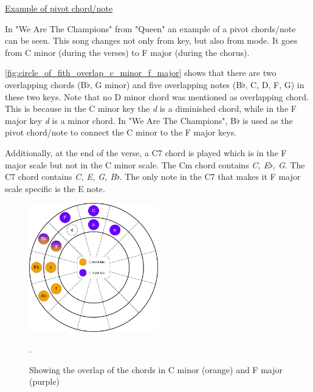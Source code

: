 \newpage

\underline{Example of pivot chord/note}

In "We Are The Champions" from "Queen" an example of a pivot chords/note can be seen. This song changes not only from key, but also from mode. It goes from C minor (during the verses) to F major (during the chorus).

\autoref{fig:circle_of_fith_overlap_c_minor_f_major} shows that there are two overlapping chords (B$\flat$, G minor) and five overlapping notes (B$\flat$, C, D, F, G) in these two keys. Note that no D minor chord was mentioned as overlapping chord. This is because in the C minor key the \textit{d} is a diminished chord, while in the F major key \textit{d} is a minor chord. In "We Are The Champions", B$\flat$ is used as the pivot chord/note to connect the C minor to the F major keys.

Additionally, at the end of the verse, a C7 chord is played which is in the F major scale but not in the C minor scale. The Cm chord contains \textit{C, E$\flat$, G}. The C7 chord contains \textit{C, E, G, B$\flat$}. The only note in the C7 that makes it F major scale specific is the E note.

\begin{figure}[h]
	\centering
	\includegraphics[width=0.5\textwidth]{../../Images/CircleOfFifthsCminorFmajor.png}
	\caption{Showing the overlap of the chords in C minor (orange) and F major (purple)}.
	\label{fig:circle_of_fith_overlap_c_minor_f_major}
\end{figure}



